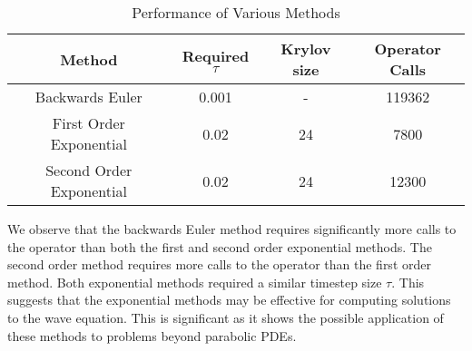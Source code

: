 \begin{table}[H]
    \centering
    \begin{tabular}{| c | c | c | c |}
    \hline
    Method & Required $\tau$ & Krylov size & Operator Calls\\
    \hline
    Backwards Euler & 0.001 & - & 119362 \\
    First Order Exponential & 0.02 & 24 & 7800 \\
    Second Order Exponential & 0.02 & 24 & 12300 \\
    \hline
    \end{tabular}
    \caption{Performance of Various Methods}
    \label{tab:reduced_data}
\end{table}

We observe that the backwards Euler method requires significantly more calls to the operator than both the first and second order exponential methods.
The second order method requires more calls to the operator than the first order method.
Both exponential methods required a similar timestep size $\tau$.
This suggests that the exponential methods may be effective for computing solutions to the wave equation.
This is significant as it shows the possible application of these methods to problems beyond parabolic PDEs.